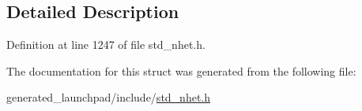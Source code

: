 \subsection{Detailed Description}


Definition at line 1247 of file std\+\_\+nhet.\+h.



The documentation for this struct was generated from the following file\+:\begin{DoxyCompactItemize}
\item 
generated\+\_\+launchpad/include/\mbox{\hyperlink{std__nhet_8h}{std\+\_\+nhet.\+h}}\end{DoxyCompactItemize}
